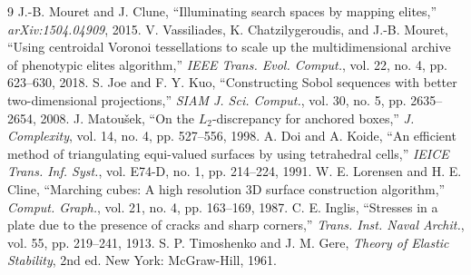 \documentclass[10pt,journal,letterpaper]{IEEEtran}
\begin{document}
\begin{thebibliography}{9}
 J.-B. Mouret and J. Clune, ``Illuminating search spaces by mapping elites,'' \emph{arXiv:1504.04909}, 2015.
 V. Vassiliades, K. Chatzilygeroudis, and J.-B. Mouret, ``Using centroidal Voronoi tessellations to scale up the multidimensional archive of phenotypic elites algorithm,'' \emph{IEEE Trans. Evol. Comput.}, vol. 22, no. 4, pp. 623--630, 2018.
 S. Joe and F. Y. Kuo, ``Constructing Sobol sequences with better two-dimensional projections,'' \emph{SIAM J. Sci. Comput.}, vol. 30, no. 5, pp. 2635--2654, 2008.
 J. Matou\v{s}ek, ``On the $L_2$-discrepancy for anchored boxes,'' \emph{J. Complexity}, vol. 14, no. 4, pp. 527--556, 1998.
 A. Doi and A. Koide, ``An efficient method of triangulating equi-valued surfaces by using tetrahedral cells,'' \emph{IEICE Trans. Inf. Syst.}, vol. E74-D, no. 1, pp. 214--224, 1991.
 W. E. Lorensen and H. E. Cline, ``Marching cubes: A high resolution 3D surface construction algorithm,'' \emph{Comput. Graph.}, vol. 21, no. 4, pp. 163--169, 1987.
 C. E. Inglis, ``Stresses in a plate due to the presence of cracks and sharp corners,'' \emph{Trans. Inst. Naval Archit.}, vol. 55, pp. 219--241, 1913.
 S. P. Timoshenko and J. M. Gere, \emph{Theory of Elastic Stability}, 2nd ed. New York: McGraw-Hill, 1961.
\end{thebibliography}
\end{document}
